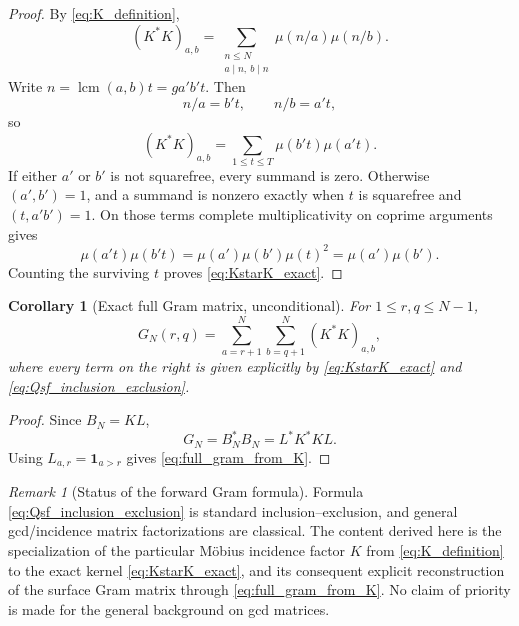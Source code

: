 \documentclass[11pt]{amsart}
\numberwithin{equation}{section}
\theoremstyle{plain}
\newtheorem{corollary}[theorem]{Corollary}
\theoremstyle{definition}
\theoremstyle{remark}
\newtheorem{remark}[theorem]{Remark}
\newcommand{\one}{\mathbf 1}
\newcommand{\mob}{\mu}
\DeclareMathOperator{\lcm}{lcm}
\begin{document}
\begin{proof}
By \eqref{eq:K_definition},
\begin{equation}
(K^*K)_{a,b}
=\sum_{\substack{n\le N\\a\mid n,\ b\mid n}}
\mob(n/a)\mob(n/b).
\label{eq:KstarK_start}
\end{equation}
Write $n=\lcm(a,b)t=ga'b't$.  Then
\begin{equation}
n/a=b't,
\qquad n/b=a't,
\label{eq:KstarK_quotients}
\end{equation}
so
\begin{equation}
(K^*K)_{a,b}=\sum_{1\le t\le T}\mob(b't)\mob(a't).
\label{eq:KstarK_tsum}
\end{equation}
If either $a'$ or $b'$ is not squarefree, every summand is zero.  Otherwise $(a',b')=1$, and a summand is nonzero exactly when $t$ is squarefree and $(t,a'b')=1$.  On those terms complete multiplicativity on coprime arguments gives
\begin{equation}
\mob(a't)\mob(b't)
=\mob(a')\mob(b')\mob(t)^2
=\mob(a')\mob(b').
\label{eq:KstarK_sign_collapse}
\end{equation}
Counting the surviving $t$ proves \eqref{eq:KstarK_exact}.
\end{proof}

\begin{corollary}[Exact full Gram matrix, unconditional]
\label{cor:full_gram_exact}
For $1\le r,q\le N-1$,
\begin{equation}
G_N(r,q)
=\sum_{a=r+1}^{N}\sum_{b=q+1}^{N}(K^*K)_{a,b},
\label{eq:full_gram_from_K}
\end{equation}
where every term on the right is given explicitly by \eqref{eq:KstarK_exact} and \eqref{eq:Qsf_inclusion_exclusion}.
\end{corollary}

\begin{proof}
Since $B_N=KL$,
\begin{equation}
G_N=B_N^*B_N=L^*K^*KL.
\label{eq:G_LKL}
\end{equation}
Using $L_{a,r}=\one_{a>r}$ gives \eqref{eq:full_gram_from_K}.
\end{proof}

\begin{remark}[Status of the forward Gram formula]
\label{rem:forward_gram_status}
Formula \eqref{eq:Qsf_inclusion_exclusion} is standard inclusion--exclusion, and general gcd/incidence matrix factorizations are classical.  The content derived here is the specialization of the particular Möbius incidence factor $K$ from \eqref{eq:K_definition} to the exact kernel \eqref{eq:KstarK_exact}, and its consequent explicit reconstruction of the surface Gram matrix through \eqref{eq:full_gram_from_K}.  No claim of priority is made for the general background on gcd matrices.
\end{remark}
\end{document}
